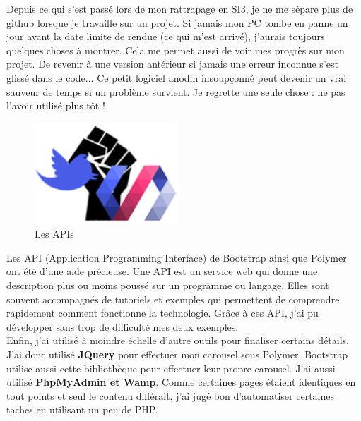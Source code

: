 \documentclass{article}
\begin{document}
Depuis ce qui s'est pass\'e lors de mon rattrapage en SI3, je ne me s\'epare plus de github lorsque je travaille sur un projet. Si jamais mon PC tombe en panne un jour avant la date limite de rendue (ce qui m'est arriv\'e), j'aurais toujours quelques choses \`a montrer. Cela me permet aussi de voir mes progr\`es sur mon projet. De revenir \`a une version ant\'erieur si jamais une erreur inconnue s'est gliss\'e dans le code... Ce petit logiciel anodin insoup\c{c}onn\'e peut devenir un vrai sauveur de temps si un probl\`eme survient. Je regrette une seule chose : ne pas l'avoir utilis\'e plus t\^ot !
\vspace{0.5cm}\\
\begin{figure}
  \vspace{-50pt}
  \begin{center}
    \includegraphics[width=0.48\textwidth]{p24}
  \end{center}
  \vspace{-20pt}
  \caption{Les APIs}
  \vspace{-10pt}
\end{figure}

Les API (Application Programming Interface) de Bootstrap ainsi que Polymer ont \'et\'e d'une aide pr\'ecieuse. Une API est un service web qui donne une description plus ou moins pouss\'e sur un programme ou langage. Elles sont souvent accompagn\'es de tutoriels et exemples qui permettent de comprendre rapidement comment fonctionne la technologie. Gr\^ace \`a ces API, j'ai pu d\'evelopper sans trop de difficult\'e mes deux exemples.
\vspace{0.5cm}\\
Enfin, j'ai utilis\'e \`a moindre \'echelle d'autre outils pour finaliser certains d\'etails. J'ai donc utilis\'e \textbf{JQuery} pour effectuer mon carousel sous Polymer. Bootstrap utilise aussi cette biblioth\`eque pour effectuer leur propre carousel. J'ai aussi utilis\'e \textbf{PhpMyAdmin et Wamp}. Comme certaines pages \'etaient identiques en tout points et seul le contenu diff\'erait, j'ai jug\'e bon d'automatiser certaines taches en utilisant un peu de PHP.
\newpage
\end{document}
